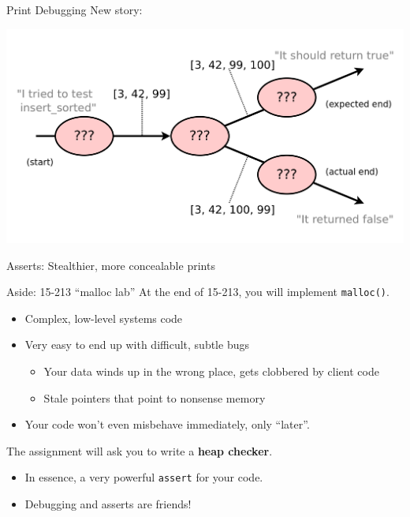 \documentclass[xcolor=dvipsnames]{beamer}
\begin{document}
\begin{frame}{Print Debugging}
	New story:

	\linegap
	\includegraphics[width=\textwidth]{time1.png}
\end{frame}

\begin{frame}{Asserts: Stealthier, more concealable prints}
\end{frame}

\begin{frame}{Aside: 15-213 ``malloc lab''}
	At the end of 15-213, you will implement \texttt{malloc()}.
	\begin{itemize}
		\item Complex, low-level systems code
		\item Very easy to end up with difficult, subtle bugs
		\begin{itemize}
			\item Your data winds up in the wrong place, gets clobbered by client code
			\item Stale pointers that point to nonsense memory
		\end{itemize}
		\item Your code won't even misbehave immediately, only ``later''.
	\end{itemize}
	\pause
	\linegap

	The assignment will ask you to write a {\bf heap checker}.
	\begin{itemize}
		\item In essence, a very powerful \texttt{assert} for your code.
		\item Debugging and asserts are friends!
	\end{itemize}
\end{frame}
\end{document}
